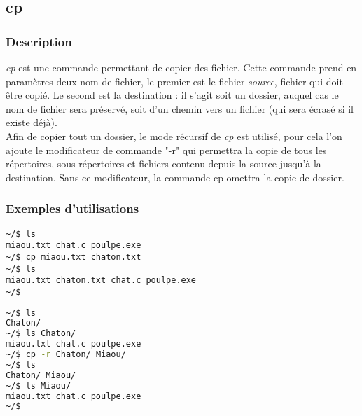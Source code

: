 \subsection*{cp}
\subsubsection*{Description}
\emph{cp} est une commande permettant de copier des fichier.
Cette commande prend en paramètres deux nom de fichier, le premier est le fichier \emph{source}, fichier qui doit être copié. Le second est la destination : il s'agit soit un dossier, auquel cas le nom de fichier sera préservé, soit d'un chemin vers un fichier (qui sera écrasé si il existe déjà).\\
Afin de copier tout un dossier, le mode récursif de \emph{cp} est utilisé, pour cela l'on ajoute le modificateur de commande "-r" qui permettra la copie de tous les répertoires, sous répertoires et fichiers contenu depuis la source jusqu'à la destination.
Sans ce modificateur, la commande cp omettra la copie de dossier.

\subsubsection*{Exemples d'utilisations}

\begin{lstlisting}[caption=copie de fichier]
~/$ ls
miaou.txt chat.c poulpe.exe
~/$ cp miaou.txt chaton.txt
~/$ ls
miaou.txt chaton.txt chat.c poulpe.exe
~/$
\end{lstlisting}

\begin{lstlisting}[language=bash,caption=copie de dossier]
~/$ ls
Chaton/
~/$ ls Chaton/
miaou.txt chat.c poulpe.exe
~/$ cp -r Chaton/ Miaou/
~/$ ls
Chaton/ Miaou/
~/$ ls Miaou/
miaou.txt chat.c poulpe.exe
~/$
\end{lstlisting}
